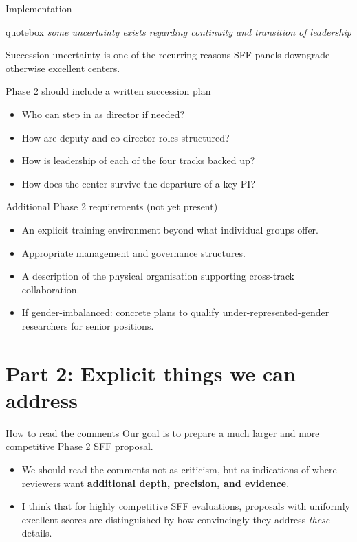\documentclass[10pt,aspectratio=169]{beamer}
\newcommand{\reviewerquote}[1]{%
  \begin{beamercolorbox}[sep=6pt,rounded=true,shadow=true]{quotebox}%
  \itshape #1%
  \end{beamercolorbox}%
}
\begin{document}
\begin{frame}{Implementation}
  \reviewerquote{some uncertainty exists regarding continuity and transition of leadership}
  \vfill
  Succession uncertainty is one of the recurring reasons SFF panels downgrade otherwise excellent centers.
  \vfill
  \begin{block}{Phase 2 should include a written succession plan}
    \begin{itemize}
      \item Who can step in as director if needed?
      \item How are deputy and co-director roles structured?
      \item How is leadership of each of the four tracks backed up?
      \item How does the center survive the departure of a key PI?
    \end{itemize}
  \end{block}
  \begin{block}{Additional Phase 2 requirements (not yet present)}
    \begin{itemize}
      \item An explicit training environment beyond what individual groups offer.
      \item Appropriate management and governance structures.
      \item A description of the physical organisation supporting cross-track collaboration.
      \item If gender-imbalanced: concrete plans to qualify under-represented-gender researchers
            for senior positions.
    \end{itemize}
  \end{block}
\end{frame}

\section{Part 2: Explicit things we can address}

\begin{frame}{How to read the comments}
  Our goal is to prepare a much larger and more competitive Phase 2 SFF proposal.
  \vfill
  \begin{itemize}
    \item We should read the comments not as criticism, but as indications of where reviewers want
          \textbf{additional depth, precision, and evidence}.
    \item I think that for  highly competitive SFF evaluations, proposals with uniformly excellent scores are
          distinguished by how convincingly they address \emph{these} details.
  \end{itemize}
\end{frame}
\end{document}
